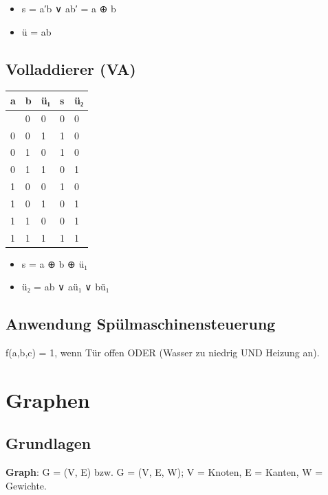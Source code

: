 \documentclass[11pt, a4paper]{article}
\begin{document}
\begin{itemize}
  \item s = a′b ∨ ab′ = a ⊕ b
  \item ü = ab
\end{itemize}


\subsection{Volladdierer (VA)}


{\small
\begin{tabularx}{\linewidth}{XXXXX}
\hline
\rowcolor{tableheadbg}
{\color{white}\textbf{a}} & {\color{white}\textbf{b}} & {\color{white}\textbf{ü₁}} & {\color{white}\textbf{s}} & {\color{white}\textbf{ü₂}} \\[2pt]
\hline
\endhead
\hline
\endfoot
0 & 0 & 0 & 0 & 0 \\
0 & 0 & 1 & 1 & 0 \\
0 & 1 & 0 & 1 & 0 \\
0 & 1 & 1 & 0 & 1 \\
1 & 0 & 0 & 1 & 0 \\
1 & 0 & 1 & 0 & 1 \\
1 & 1 & 0 & 0 & 1 \\
1 & 1 & 1 & 1 & 1 \\
\end{tabularx}
}


\begin{itemize}
  \item s = a ⊕ b ⊕ ü₁
  \item ü₂ = ab ∨ aü₁ ∨ bü₁
\end{itemize}


\subsection{Anwendung Spülmaschinensteuerung}

f(a,b,c) = 1, wenn Tür offen ODER (Wasser zu niedrig UND Heizung an).



\section{Graphen}


\subsection{Grundlagen}

\textbf{Graph}: G = (V, E) bzw. G = (V, E, W); V = Knoten, E = Kanten, W = Gewichte.
\end{document}
